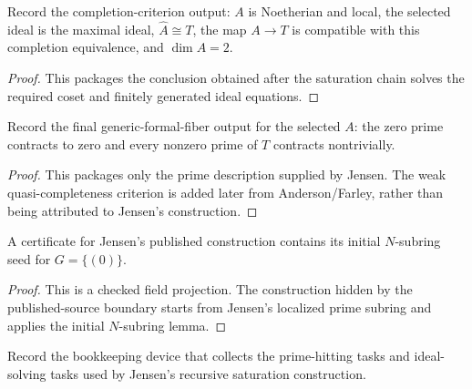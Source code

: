 \begin{definition}
  \label{def:jensen_completion_criterion_output_data}
  Record the completion-criterion output: \(A\) is Noetherian and local, the
  selected ideal is the maximal ideal, \(\widehat A\cong T\), the map
  \(A\to T\) is compatible with this completion equivalence, and
  \(\dim A=2\).
\end{definition}

\begin{proof}
  This packages the conclusion obtained after the saturation chain solves the
  required coset and finitely generated ideal equations.
\end{proof}

\begin{definition}
  \label{def:jensen_generic_fiber_output_data}
  Record the final generic-formal-fiber output for the selected \(A\): the zero
  prime contracts to zero and every nonzero prime of \(T\) contracts
  nontrivially.
\end{definition}

\begin{proof}
  This packages only the prime description supplied by Jensen.  The weak
  quasi-completeness criterion is added later from Anderson/Farley, rather than
  being attributed to Jensen's construction.
\end{proof}

\begin{lemma}
  \label{lem:jensen_n_subring_seed_source}
  A certificate for Jensen's published construction contains its initial
  \(N\)-subring seed for \(G=\{(0)\}\).
\end{lemma}

\begin{proof}
  This is a checked field projection.  The construction hidden by the
  published-source boundary starts from Jensen's localized prime subring and
  applies the initial \(N\)-subring lemma.
\end{proof}

\begin{definition}
  \label{def:jensen_saturation_task_enumeration}
  Record the bookkeeping device that collects the prime-hitting tasks and
  ideal-solving tasks used by Jensen's recursive saturation construction.
\end{definition}

